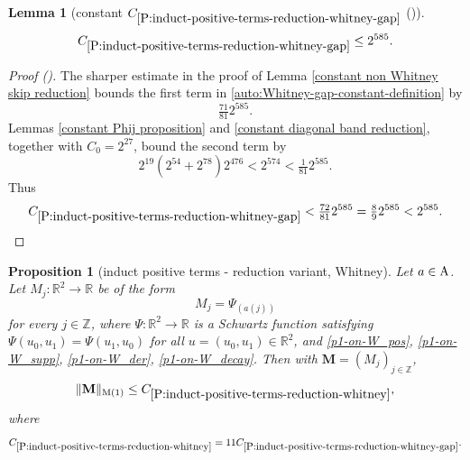 \documentclass[12pt,reqno]{amsart}
\newcommand{\auto}{{({\tiny\faCar})}}
\theoremstyle{plain}
\newtheorem{lemma}[theorem]{Lemma}
\newtheorem{proposition}[theorem]{Proposition}
\numberwithin{equation}{section}
\theoremstyle{remark}
\newcommand{\using}[1]{}
\newcommand{\Z}{{\mathbb Z}}
\newcommand{\M}{\mathbf{M}}
\DeclareMathOperator{\supp}{supp}
\newcommand{\pd}[1]{{\color{blue}{[P: #1]}}}
\begin{document}
\begin{lemma}[constant $C_{\ref{P:induct-positive-terms-reduction-whitney-gap}}$ \auto]\label{constant Whitney gap reduction}\using{constant non Whitney skip reduction}\using{P:induct-positive-terms-reduction-whitney-gap}\using{constant Phij proposition}\using{constant diagonal band reduction}
\begin{equation}\label{constant Whitney gap reduction bound}
C_{\ref{P:induct-positive-terms-reduction-whitney-gap}}\le2^{585}.
\end{equation}
\end{lemma}
\begin{proof}[Proof \auto]
The sharper estimate in the proof of Lemma \ref{constant non Whitney skip reduction} bounds the first term in \eqref{auto:Whitney-gap-constant-definition} by
\[
\tfrac{71}{81}2^{585}.
\]
Lemmas \ref{constant Phij proposition} and \ref{constant diagonal band reduction}, together with $C_0=2^{27}$, bound the second term by
\[
2^{19}(2^{54}+2^{78})2^{476}<2^{574}<\tfrac1{81}2^{585}.
\]
Thus
\[
C_{\ref{P:induct-positive-terms-reduction-whitney-gap}}
<\tfrac{72}{81}2^{585}=\tfrac89 2^{585}<2^{585}.
\]
\end{proof}


\pd{\begin{equation}\label{auto:smooth-decay-estimate-restatement}|\phi(x)|\leq 2^{N} \max(\|\widehat{\phi}\|_\infty, (2\pi )^{-N}\|\widehat{\phi}^{(N)}\|_\infty)|\supp (\widehat{\phi})|   \langle x\rangle^{N}
 \end{equation}
 with $C_{\ref{lem:smoothdecay2}, N}=2^{N} $. }


\begin{proposition}[induct positive terms - reduction variant, Whitney]
\label{P:induct-positive-terms-reduction-whitney}\using{P:induct-positive-terms-reduction-whitney-gap}
Let $a\in {\rm A}$. Let $M_j:\mathbb{R}^2\to \mathbb{R}$ be of the form
\begin{equation}\label{auto:Whitney-kernel}
M_j=\Psi_{(a(j))}
\end{equation}
for every $j\in\Z$, where $\Psi:\mathbb{R}^2\to \mathbb{R}$ is a Schwartz function satisfying $\Psi(u_0,u_1)=\Psi(u_1,u_0)$ for all $u=(u_0,u_1)\in\mathbb{R}^2$, and \eqref{p1-on-W_pos}, \eqref{p1-on-W_supp}, \eqref{p1-on-W_der}, \eqref{p1-on-W_decay}. Then with $\M=(M_j)_{j\in\Z}$,
\begin{equation}\label{auto:Whitney-reduction-bound}
\|\M\|_{\rm M(1)} \le C_{\ref{P:induct-positive-terms-reduction-whitney}},
\end{equation}
where
\begin{equation}\label{auto:Whitney-constant-definition}
C_{\ref{P:induct-positive-terms-reduction-whitney}}
=11C_{\ref{P:induct-positive-terms-reduction-whitney-gap}}.
\end{equation}
\end{proposition}
\end{document}

